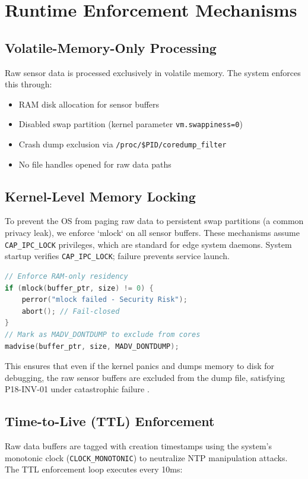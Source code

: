 \documentclass[conference]{IEEEtran}
\begin{document}
\section{Runtime Enforcement Mechanisms}

\subsection{Volatile-Memory-Only Processing}
Raw sensor data is processed exclusively in volatile memory. The system enforces this through:
\begin{itemize}
    \item RAM disk allocation for sensor buffers
    \item Disabled swap partition (kernel parameter \texttt{vm.swappiness=0})
    \item Crash dump exclusion via \texttt{/proc/\$PID/coredump\_filter}
    \item No file handles opened for raw data paths
\end{itemize}

\subsection{Kernel-Level Memory Locking}
To prevent the OS from paging raw data to persistent swap partitions (a common privacy leak), we enforce `mlock` on all sensor buffers. These mechanisms assume \texttt{CAP\_IPC\_LOCK} privileges, which are standard for edge system daemons. System startup verifies \texttt{CAP\_IPC\_LOCK}; failure prevents service launch.

\begin{lstlisting}[language=C, caption={Kernel Locking Strategy}]
// Enforce RAM-only residency
if (mlock(buffer_ptr, size) != 0) {
    perror("mlock failed - Security Risk");
    abort(); // Fail-closed
}
// Mark as MADV_DONTDUMP to exclude from cores
madvise(buffer_ptr, size, MADV_DONTDUMP);
\end{lstlisting}

This ensures that even if the kernel panics and dumps memory to disk for debugging, the raw sensor buffers are excluded from the dump file, satisfying P18-INV-01 under catastrophic failure \cite{b21}.

\subsection{Time-to-Live (TTL) Enforcement}
Raw data buffers are tagged with creation timestamps using the system's monotonic clock (\texttt{CLOCK\_MONOTONIC}) to neutralize NTP manipulation attacks. The TTL enforcement loop executes every 10ms:
\end{document}
